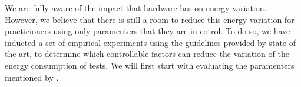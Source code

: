 We are fully aware of the impact that hardware has on energy variation. However, we believe that there is still a room to reduce this energy variation for practicioners using only paramenters that they are in cotrol.
To do so, we have inducted a set of empirical experiments using the guidelines provided by state of the art, to determine which controllable factors can reduce the variation of the energy consumption of tests.
We will first start with evaluating the paramenters mentioned by \cite{heinrich_predicting}.

